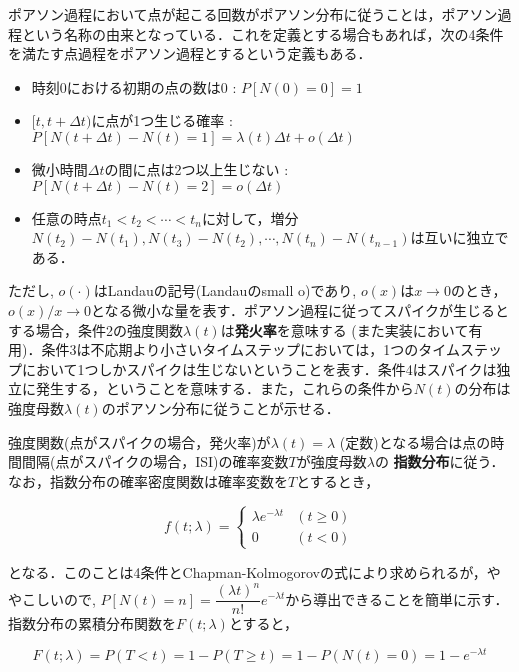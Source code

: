 ポアソン過程において点が起こる回数がポアソン分布に従うことは，ポアソン過程という名称の由来となっている．これを定義とする場合もあれば，次の4条件を満たす点過程をポアソン過程とするという定義もある．

\begin{itemize}
\item 時刻0における初期の点の数は0 : $P[N(0)=0]=1$ 
\item $[t, t+\Delta t)$に点が1つ生じる確率 : $P[N(t+\Delta t)-N(t)=1]=\lambda(t)\Delta t+o(\Delta t)$
\item 微小時間$\Delta t$の間に点は2つ以上生じない : $P[N(t+\Delta t)-N(t)=2]=o(\Delta t)$
\item 任意の時点$t_1 < t_2 < \cdots< t_n$に対して，増分 $N(t_2)-N(t_1), N(t_3)-N(t_2), \cdots, N(t_n)-N(t_{n−1})$は互いに独立である．
\end{itemize}

ただし, $o(\cdot)$はLandauの記号(Landauのsmall o)であり, $o(x)$は$x\to 0$のとき，$o(x)/x\to 0$となる微小な量を表す．ポアソン過程に従ってスパイクが生じるとする場合，条件2の強度関数$\lambda(t)$は\textbf{発火率}を意味する (また実装において有用)．条件3は不応期より小さいタイムステップにおいては，1つのタイムステップにおいて1つしかスパイクは生じないということを表す．条件4はスパイクは独立に発生する，ということを意味する．また，これらの条件から$N(t)$の分布は強度母数$\lambda(t)$のポアソン分布に従うことが示せる．

強度関数(点がスパイクの場合，発火率)が$\lambda(t)=\lambda$ (定数)となる場合は点の時間間隔(点がスパイクの場合，ISI)の確率変数$T$が強度母数$\lambda$の \textbf{指数分布}に従う．なお，指数分布の確率密度関数は確率変数を$T$とするとき，


\begin{equation}
f(t;\lambda )=\left\{{\begin{array}{ll}\lambda e^{-\lambda t}&(t\geq 0)\\0&(t<0)\end{array}}\right.
\end{equation}


となる．このことは4条件とChapman-Kolmogorovの式により求められるが，ややこしいので, $P[N(t)=n]=\dfrac{(\lambda t)^{n}}{n !} e^{-\lambda t}$から導出できることを簡単に示す．指数分布の累積分布関数を$F(t; \lambda)$とすると，


\begin{equation}
F(t; \lambda) = P(T< t)=1-P(T\geq t)=1-P(N(t)=0)=1-e^{-\lambda t}
\end{equation}


